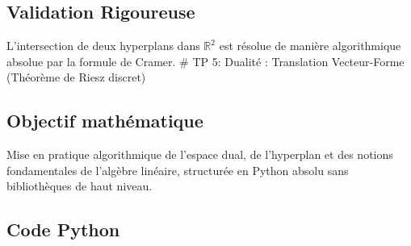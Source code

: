 \hypertarget{validation-rigoureuse-3}{%
\subsection{Validation Rigoureuse}\label{validation-rigoureuse-3}}

L'intersection de deux hyperplans dans \(\mathbb{R}^2\) est résolue de
manière algorithmique absolue par la formule de Cramer. \# TP 5: Dualité
: Translation Vecteur-Forme (Théorème de Riesz discret)

\hypertarget{objectif-mathuxe9matique-4}{%
\subsection{Objectif mathématique}\label{objectif-mathuxe9matique-4}}

Mise en pratique algorithmique de l'espace dual, de l'hyperplan et des
notions fondamentales de l'algèbre linéaire, structurée en Python absolu
sans bibliothèques de haut niveau.

\hypertarget{code-python-4}{%
\subsection{Code Python}\label{code-python-4}}

